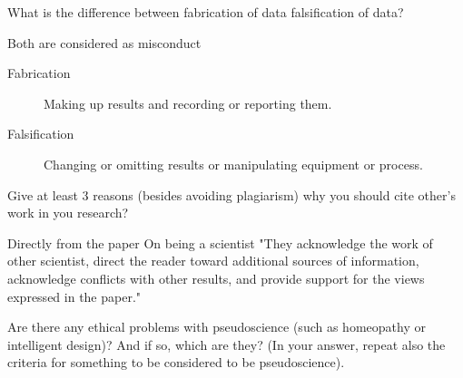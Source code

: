 \documentclass[a4paper,twoside=false,abstract=false,numbers=noenddot,
titlepage=false,headings=small,parskip=half,version=last]{scrartcl}
\begin{document}

\begin{exercise}{1}
    What is the difference between fabrication of data falsification of data?
\end{exercise}
\begin{solution} Both are considered as misconduct \\
    \begin{description}
       \item[Fabrication] Making up results and recording or reporting them. \\
       \item[Falsification] Changing or omitting results or manipulating
       equipment or process. \\
    \end{description}
\end{solution}
\begin{exercise}{2}
    Give at least 3 reasons (besides avoiding plagiarism) why you should cite
    other's work in you research?
\end{exercise}
\begin{solution}
    Directly from the paper On being a scientist "They acknowledge the work of
    other scientist, direct the reader toward additional sources of
    information, acknowledge conflicts with other results, and provide support
    for the views expressed in the paper."
\end{solution}
\begin{exercise}{3}
    Are there any ethical problems with pseudoscience (such as homeopathy or
    intelligent design)? And if so, which are they? (In your answer, repeat
    also the criteria for something to be considered to be pseudoscience).
\end{exercise}
\begin{solution}
    
\end{solution}
\end{document}
